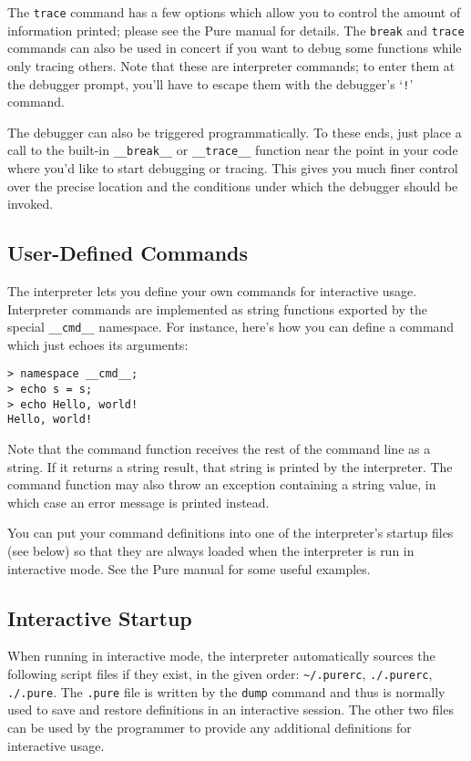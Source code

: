 \documentclass[a4paper,12pt]{article}
\begin{document}
The \texttt{trace} command has a few options which allow you to control the amount of information printed; please see the Pure manual for details. The \texttt{break} and \texttt{trace} commands can also be used in concert if you want to debug some functions while only tracing others. Note that these are interpreter commands; to enter them at the debugger prompt, you'll have to escape them with the debugger's `\verb|!|' command.

The debugger can also be triggered programmatically. To these ends, just place a call to the built-in \verb|__break__| or \verb|__trace__| function near the point in your code where you'd like to start debugging or tracing. This gives you much finer control over the precise location and the conditions under which the debugger should be invoked.

\subsection{User-Defined Commands}

The interpreter lets you define your own commands for interactive usage. Interpreter commands are implemented as string functions exported by the special \verb|__cmd__| namespace. For instance, here's how you can define a command which just echoes its arguments:

\begin{lstlisting}
> namespace __cmd__;
> echo s = s;
> echo Hello, world!
Hello, world!
\end{lstlisting}

Note that the command function receives the rest of the command line as a string. If it returns a string result, that string is printed by the interpreter. The command function may also throw an exception containing a string value, in which case an error message is printed instead.

You can put your command definitions into one of the interpreter's startup files (see below) so that they are always loaded when the interpreter is run in interactive mode. See the Pure manual for some useful examples.

\subsection{Interactive Startup}

When running in interactive mode, the interpreter automatically sources the following script files if they exist, in the given order: \verb|~/.purerc|, \verb|./.purerc|, \verb|./.pure|. The \verb|.pure| file is written by the \verb|dump| command and thus is normally used to save and restore definitions in an interactive session. The other two files can be used by the programmer to provide any additional definitions for interactive usage.
\end{document}
